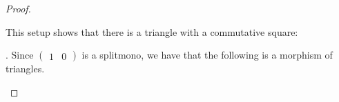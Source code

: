 \documentclass[11pt]{article}
\theoremstyle{definition}
\theoremstyle{remark}
\begin{document}
\begin{proof}
\begin{center}
\begin{tikzcd}[row sep=small]
                    \end{tikzcd}
                \end{center}
                This setup shows that there is a triangle with a commutative square:
                \begin{center}
                \end{center}.
                Since $\begin{pmatrix}1 & 0\end{pmatrix}$ is a splitmono, we have that the following is a morphism of triangles.
                \begin{center}
                \end{center}
            \end{proof}
\end{document}
